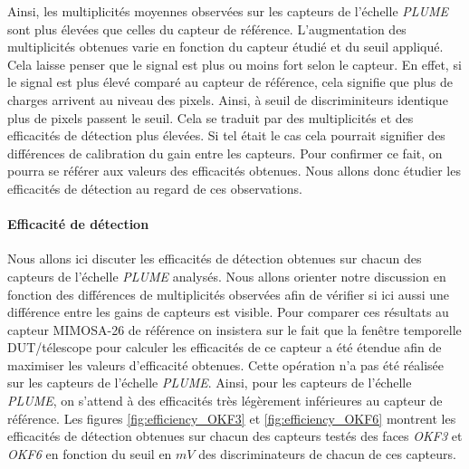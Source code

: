    \medskip

   Ainsi, les multiplicit\'es moyennes observ\'ees sur les capteurs de l'\'echelle \textit{PLUME} sont plus \'elev\'ees que celles du capteur de r\'ef\'erence. L'augmentation des multiplicit\'es obtenues varie en fonction du capteur \'etudi\'e et du seuil appliqu\'e. Cela laisse penser que le signal est plus ou moins fort selon le capteur. En effet, si le signal est plus \'elev\'e compar\'e au capteur de r\'ef\'erence, cela signifie que plus de charges arrivent au niveau des pixels. Ainsi, \`a seuil de discriminiteurs identique plus de pixels passent le seuil. Cela se traduit par des multiplicit\'es et des efficacit\'es de d\'etection plus \'elev\'ees. Si tel \'etait le cas cela pourrait signifier des diff\'erences de calibration du gain entre les capteurs. Pour confirmer ce fait, on pourra se r\'ef\'erer aux valeurs des efficacit\'es obtenues. Nous allons donc \'etudier les efficacit\'es de d\'etection au regard de ces observations.
   
   \paragraph{Efficacit\'e de d\'etection}
   
   Nous allons ici discuter les efficacit\'es de d\'etection obtenues sur chacun des capteurs de l'\'echelle \textit{PLUME} analys\'es. Nous allons orienter notre discussion en fonction des diff\'erences de multiplicit\'es observ\'ees afin de v\'erifier si ici aussi une diff\'erence entre les gains de capteurs est visible. Pour comparer ces r\'esultats au capteur MIMOSA-26 de r\'ef\'erence on insistera sur le fait que la fen\^etre temporelle DUT/t\'elescope pour calculer les efficacit\'es de ce capteur a \'et\'e \'etendue afin de maximiser les valeurs d'efficacit\'e obtenues. Cette op\'eration n'a pas \'et\'e r\'ealis\'ee sur les capteurs de l'\'echelle \textit{PLUME}. Ainsi, pour les capteurs de l'\'echelle \textit{PLUME}, on s'attend \`a des efficacit\'es tr\`es l\'eg\`erement inf\'erieures au capteur de r\'ef\'erence. Les figures \ref{fig:efficiency_OKF3} et \ref{fig:efficiency_OKF6} montrent les efficacit\'es de d\'etection obtenues sur chacun des capteurs test\'es des faces \textit{OKF3} et \textit{OKF6} en fonction du seuil en $mV$ des discriminateurs de chacun de ces capteurs.

  
